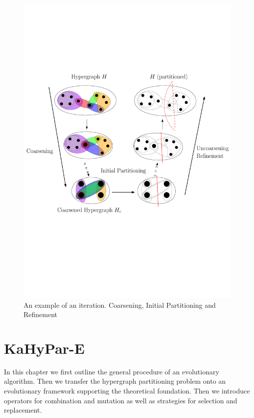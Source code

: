 \documentclass[a4paper,12pt,titlepage, BCOR7mm,headsepline]{scrbook}
\numberwithin{equation}{section}
\begin{document}
\begin{figure}[H] 
    \vspace*{-.25cm}
  \centering
   \includegraphics[width=.8\textwidth]{Ipe/Memetic_process.pdf}
  \caption{An example of an iteration. Coarsening, Initial Partitioning and Refinement}\label{fig:coarseningexample} %

\end{figure}



\chapter{KaHyPar-E}
\label{chapter:kahypare}
In this chapter we first outline the general procedure of an evolutionary algorithm. Then we transfer the hypergraph partitioning problem onto an evolutionary framework supporting the 
theoretical foundation. Then we introduce operators for combination and mutation as well as strategies for selection and replacement.
\end{document}
